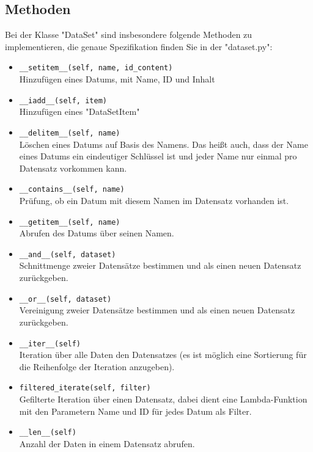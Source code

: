 \documentclass[]{article}
\begin{document}
\subsection{Methoden}
Bei der Klasse "DataSet" sind insbesondere folgende Methoden zu implementieren, die genaue Spezifikation finden Sie in der "dataset.py":

\begin{itemize}[label=$\bullet$]
  \item \texttt{\_\_setitem\_\_(self, name, id\_content)}\\
  Hinzufügen eines Datums, mit Name, ID und Inhalt
  
  \item \texttt{\_\_iadd\_\_(self, item)}\\
  Hinzufügen eines "DataSetItem"
  
  \item \texttt{\_\_delitem\_\_(self, name)}\\
  Löschen eines Datums auf Basis des Namens.
  Das heißt auch, dass der Name eines Datums ein eindeutiger Schlüssel ist und jeder Name nur einmal pro Datensatz vorkommen kann.
  
  \item \texttt{\_\_contains\_\_(self, name)}\\
  Prüfung, ob ein Datum mit diesem Namen im Datensatz vorhanden ist.
  
  \item \texttt{\_\_getitem\_\_(self, name)}\\
  Abrufen des Datums über seinen Namen.
  
  \item \texttt{\_\_and\_\_(self, dataset)}\\
  Schnittmenge zweier Datensätze bestimmen und als einen neuen Datensatz zurückgeben.
  
  \item \texttt{\_\_or\_\_(self, dataset)}\\
  Vereinigung zweier Datensätze bestimmen und als einen neuen Datensatz zurückgeben.
  
  \item \texttt{\_\_iter\_\_(self)}\\
  Iteration über alle Daten den Datensatzes (es ist möglich eine Sortierung für die Reihenfolge der Iteration anzugeben).
  
  \item \texttt{filtered\_iterate(self, filter)}\\
  Gefilterte Iteration über einen Datensatz, dabei dient eine Lambda-Funktion mit den Parametern Name und ID für jedes Datum als Filter.
  
  \item \texttt{\_\_len\_\_(self)}\\
  Anzahl der Daten in einem Datensatz abrufen.
\end{itemize}
\end{document}
